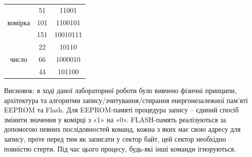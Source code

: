 \documentclass[a4paper,14pt]{extreport}
\begin{document}
 \begin{table}[h!]
\begin{tabular}{c|c|c}
\multirow{3}{*}{ комірка}  & 51  & 11001    \\
                  & 101 & 1100101  \\
                  & 151 & 10010111 \\ \hline
\multirow{3}{*}{ число} & 22  & 10110    \\
                  & 66  & 1000010  \\
                  & 44  & 101100  
\end{tabular}
\end{table}




\vspace*{1cm}
Висновок:  в ході даної лабораторної роботи було вивчено фізичні принципи, архітектура та алгоритми запису/зчитування/стирання енергонезалежної пам’яті EEPROM та Flash. Для EEPROM-памяті процедура запису – єдиний спосіб змінити значення у комірці з «1» на «0». FLASH-память реалізуються за допомогою певних послідовностей команд, кожна з яких має свою адресу для запису, проте перед тим як записати у сектор байт, цей сектор необхідно повністю стерти. Під час цього процесу, будь-які інші команди ігноруються.
\end{document}
